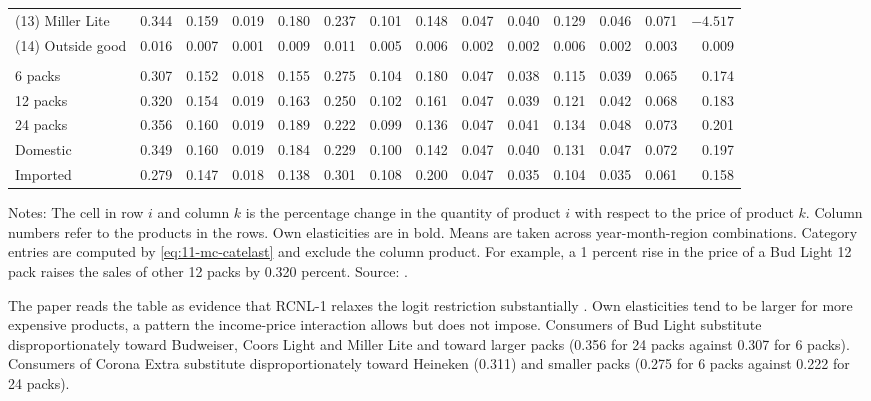 \begin{table}[htbp]
\begin{tabular}{@{}lrrrrrrrrrrrrr@{}}
(13) Miller Lite & 0.344 & 0.159 & 0.019 & 0.180 & 0.237 & 0.101 & 0.148 & 0.047 & 0.040 & 0.129 & 0.046 & 0.071 & $\mathbf{-4.517}$ \\
(14) Outside good & 0.016 & 0.007 & 0.001 & 0.009 & 0.011 & 0.005 & 0.006 & 0.002 & 0.002 & 0.006 & 0.002 & 0.003 & 0.009 \\
\addlinespace
\multicolumn{14}{@{}l}{\textit{Cross elasticities by category}} \\
6 packs & 0.307 & 0.152 & 0.018 & 0.155 & 0.275 & 0.104 & 0.180 & 0.047 & 0.038 & 0.115 & 0.039 & 0.065 & 0.174 \\
12 packs & 0.320 & 0.154 & 0.019 & 0.163 & 0.250 & 0.102 & 0.161 & 0.047 & 0.039 & 0.121 & 0.042 & 0.068 & 0.183 \\
24 packs & 0.356 & 0.160 & 0.019 & 0.189 & 0.222 & 0.099 & 0.136 & 0.047 & 0.041 & 0.134 & 0.048 & 0.073 & 0.201 \\
Domestic & 0.349 & 0.160 & 0.019 & 0.184 & 0.229 & 0.100 & 0.142 & 0.047 & 0.040 & 0.131 & 0.047 & 0.072 & 0.197 \\
Imported & 0.279 & 0.147 & 0.018 & 0.138 & 0.301 & 0.108 & 0.200 & 0.047 & 0.035 & 0.104 & 0.035 & 0.061 & 0.158 \\
\bottomrule
\end{tabular}

\smallskip
\begin{minipage}{0.97\linewidth}
\footnotesize Notes: The cell in row $i$ and column $k$ is the percentage change in the quantity of product $i$ with
respect to the price of product $k$. Column numbers refer to the products in the rows. Own elasticities are in bold.
Means are taken across year-month-region combinations. Category entries are computed by \eqref{eq:11-mc-catelast}
and exclude the column product. For example, a 1 percent rise in the price of a Bud Light 12 pack raises the sales
of other 12 packs by 0.320 percent. Source: \citet[Table V, p.~1778]{MillerWeinberg2017}.
\end{minipage}
\end{table}

The paper reads the table as evidence that RCNL-1 relaxes the logit restriction substantially
\citep[p.~1777]{MillerWeinberg2017}. Own elasticities tend to be larger for more expensive products, a pattern the
income-price interaction allows but does not impose. Consumers of Bud Light substitute disproportionately toward
Budweiser, Coors Light and Miller Lite and toward larger packs (0.356 for 24 packs against 0.307 for 6 packs).
Consumers of Corona Extra substitute disproportionately toward Heineken (0.311) and smaller packs (0.275 for 6 packs
against 0.222 for 24 packs).

